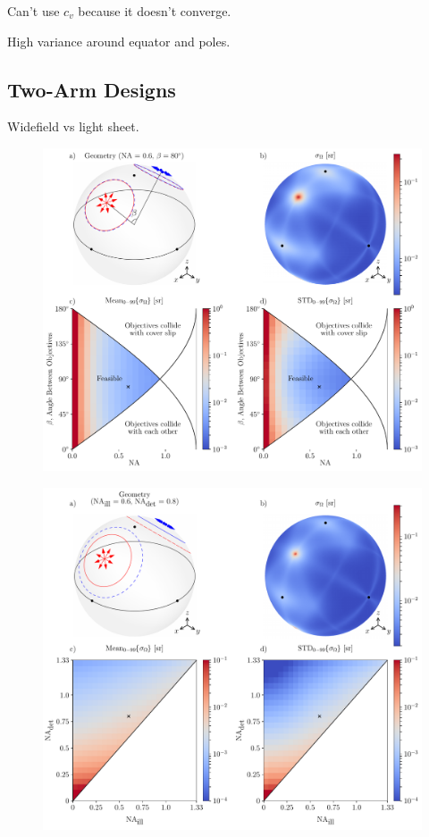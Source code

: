 \documentclass[10pt]{article}
\begin{document}
Can't use $c_v$ because it doesn't converge.

High variance around equator and poles. 

\subsection{Two-Arm Designs}
Widefield vs light sheet.
\begin{figure}[htbp]
\centering\includegraphics[width=\textwidth]{symmetric-widefield}
\caption{}
\end{figure}

\begin{figure}[htbp]
\centering\includegraphics[width=\textwidth]{double-arm}
\caption{}
\end{figure}
\end{document}
